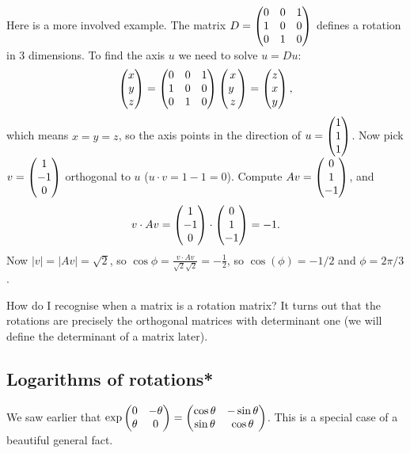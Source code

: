 \documentclass{article}
\begin{document}
\begin{Example}
Here is a more involved example. The matrix \(D=\begin{pmatrix} 0 & 0 & 1 \\ 1 &
0 & 0 \\ 0 & 1 & 0\end{pmatrix}\) defines a rotation in 3 dimensions. To find
the axis \(u\) we need to solve \(u=Du\): \[\begin{pmatrix} x \\ y \\ z \end{pmatrix}=\begin{pmatrix}
0 & 0 & 1 \\ 1 & 0 & 0 \\ 0 & 1 & 0\end{pmatrix}\begin{pmatrix} x \\ y\ \\ z\end{pmatrix}=\begin{pmatrix} z \\ x
\\ y\end{pmatrix},\] which means \(x=y=z\), so the axis points in the
direction of \(u=\begin{pmatrix} 1 \\ 1 \\ 1 \end{pmatrix}\). Now pick \(v=\begin{pmatrix} 1 \\ -1
\\ 0\end{pmatrix}\) orthogonal to \(u\) (\(u\cdot v=1-1=0\)). Compute \(Av=\begin{pmatrix}
0 \\ 1 \\ -1\end{pmatrix}\), and \[v\cdot Av=\begin{pmatrix} 1 \\ -1 \\ 0\end{pmatrix}\cdot \begin{pmatrix} 0
\\ 1 \\ -1\end{pmatrix}=-1.\] Now \(|v|=|Av|=\sqrt{2}\), so
\(\cos\phi=\frac{v\cdot Av}{\sqrt{2}\sqrt{2}}=-\frac{1}{2}\), so
\(\cos(\phi)=-1/2\) and \(\phi=2\pi/3\).


\end{Example}
\begin{Remark}
How do I recognise when a matrix is a rotation matrix? It turns out
that the rotations are precisely the orthogonal matrices with
determinant one (we will define the determinant of a matrix later).


\end{Remark}
\subsection{Logarithms of rotations*}


We saw earlier that \(\exp\begin{pmatrix} 0 & -\theta \\ \theta & 0 \end{pmatrix}=\begin{pmatrix}
\cos\theta & -\sin\theta \\ \sin\theta & \cos\theta\end{pmatrix}\). This is a
special case of a beautiful general fact.
\end{document}

